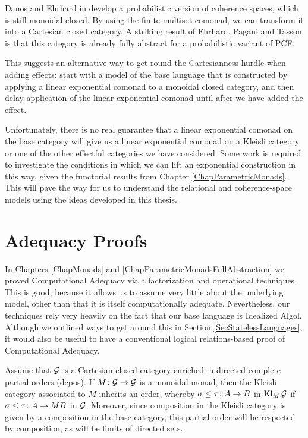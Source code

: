 \documentclass[11pt]{report}
\begin{document}
Danos and Ehrhard in \cite{ProbabilisticCoherenceSpaces} develop a probabilistic version of coherence spaces, which is still monoidal closed.  
By using the finite multiset comonad, we can transform it into a Cartesian closed category.  
A striking result of Ehrhard, Pagani and Tasson \cite{ProbabilisicPcf} is that this category is already fully abstract for a probabilistic variant of PCF.

This suggests an alternative way to get round the Cartesianness hurdle when adding effects: start with a model of the base language that is constructed by applying a linear exponential comonad to a monoidal closed category, and then delay application of the linear exponential comonad until after we have added the effect.

Unfortunately, there is no real guarantee that a linear exponential comonad on the base category will give us a linear exponential comonad on a Kleisli category or one of the other effectful categories we have considered.  
Some work is required to investigate the conditions in which we can lift an exponential construction in this way, given the functorial results from Chapter \ref{ChapParametricMonads}.  
This will pave the way for us to understand the relational and coherence-space models using the ideas developed in this thesis.

\section{Adequacy Proofs}

In Chapters \ref{ChapMonads} and \ref{ChapParametricMonadsFullAbstraction} we proved Computational Adequacy via a factorization and operational techniques.  
This is good, because it allows us to assume very little about the underlying model, other than that it is itself computationally adequate.  
Nevertheless, our techniques rely very heavily on the fact that our base language is Idealized Algol.  
Although we outlined ways to get around this in Section \ref{SecStatelessLanguages}, it would also be useful to have a conventional logical relations-based proof of Computational Adequacy.

Assume that $\mathcal G$ is a Cartesian closed category enriched in directed-complete partial orders (dcpos).
If $M\colon\mathcal G \to \mathcal G$ is a monoidal monad, then the Kleisli category associated to $M$ inherits an order, whereby $\sigma\le\tau\colon A \to B$ in $\operatorname{Kl}_M\mathcal G$ if $\sigma\le\tau\colon A \to MB$ in $\mathcal G$.
Moreover, since composition in the Kleisli category is given by a composition in the base category, this partial order will be respected by composition, as will be limits of directed sets.
\end{document}
